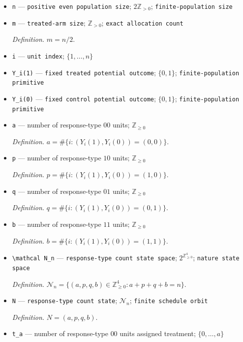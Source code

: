 \documentclass{article}
\begin{document}
\begin{itemize}
  \item \texttt{n} --- \texttt{positive even population size}; \(2\mathbb Z_{>0}\); \texttt{finite-\allowbreak{}population size}
  \item \texttt{m} --- \texttt{treated-\allowbreak{}arm size}; \(\mathbb Z_{>0}\); \texttt{exact allocation count}
  \par\smallskip\noindent\emph{Definition.} \(m=n/2\).
  \item \texttt{i} --- \texttt{unit index}; \(\{1,\ldots,n\}\)
  \item \texttt{Y\_\allowbreak{}i(1)} --- \texttt{fixed treated potential outcome}; \(\{0,1\}\); \texttt{finite-\allowbreak{}population primitive}
  \item \texttt{Y\_\allowbreak{}i(0)} --- \texttt{fixed control potential outcome}; \(\{0,1\}\); \texttt{finite-\allowbreak{}population primitive}
  \item \texttt{a} --- number of response-type \(00\) units; \(\mathbb Z_{\ge0}\)
  \par\smallskip\noindent\emph{Definition.} \(a=\#\{i:(Y_i(1),Y_i(0))=(0,0)\}\).
  \item \texttt{p} --- number of response-type \(10\) units; \(\mathbb Z_{\ge0}\)
  \par\smallskip\noindent\emph{Definition.} \(p=\#\{i:(Y_i(1),Y_i(0))=(1,0)\}\).
  \item \texttt{q} --- number of response-type \(01\) units; \(\mathbb Z_{\ge0}\)
  \par\smallskip\noindent\emph{Definition.} \(q=\#\{i:(Y_i(1),Y_i(0))=(0,1)\}\).
  \item \texttt{b} --- number of response-type \(11\) units; \(\mathbb Z_{\ge0}\)
  \par\smallskip\noindent\emph{Definition.} \(b=\#\{i:(Y_i(1),Y_i(0))=(1,1)\}\).
  \item \texttt{\textbackslash{}\allowbreak{}mathcal N\_\allowbreak{}n} --- \texttt{response-\allowbreak{}type count state space}; \(2^{\mathbb Z_{\ge0}^4}\); \texttt{nature state space}
  \par\smallskip\noindent\emph{Definition.} \(\mathcal N_n=\{(a,p,q,b)\in\mathbb Z_{\ge0}^4:a+p+q+b=n\}\).
  \item \texttt{N} --- \texttt{response-\allowbreak{}type count state}; \(\mathcal N_n\); \texttt{finite schedule orbit}
  \par\smallskip\noindent\emph{Definition.} \(N=(a,p,q,b)\).
  \item \texttt{t\_\allowbreak{}a} --- number of response-type \(00\) units assigned treatment; \(\{0,\ldots,a\}\)

\end{itemize}
\end{document}
